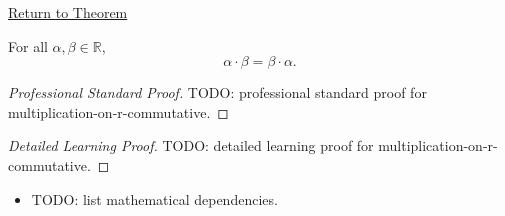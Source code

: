 \newpage
{}
\label{prf:multiplication-on-r-commutative}

\begin{remark*}[Return]
\hyperref[thm:multiplication-on-r-commutative]{Return to Theorem}
\end{remark*}

\begin{theorem*}
For all $\alpha,\beta\in\mathbb{R}$,
\[
\alpha\cdot\beta=\beta\cdot\alpha.
\]
\end{theorem*}

\begin{proof}[Professional Standard Proof]
\LRAProofBodyStart
TODO: professional standard proof for multiplication-on-r-commutative.
\end{proof}

\begin{proof}[Detailed Learning Proof]
\LRAProofBodyStart
TODO: detailed learning proof for multiplication-on-r-commutative.
\end{proof}

\begin{remark*}
\end{remark*}

\begin{dependencies}
\begin{itemize}
  \item TODO: list mathematical dependencies.
\end{itemize}
\end{dependencies}

\clearpage
